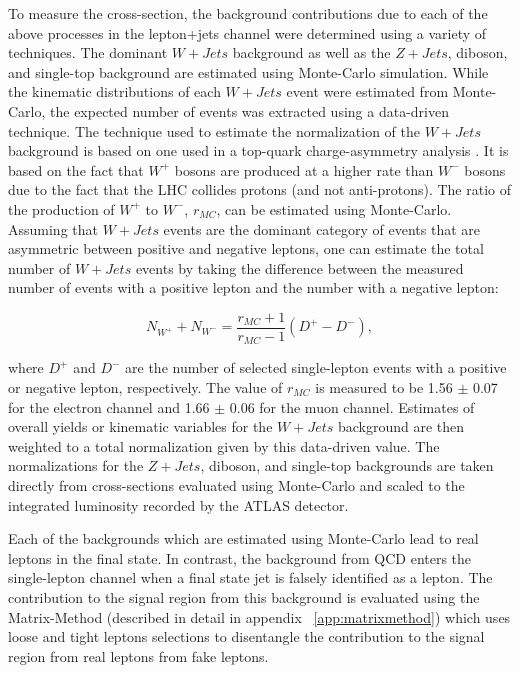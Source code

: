 To measure the cross-section, the background contributions due to each of the above processes in the lepton+jets channel were determined using a variety of techniques.
The dominant $W+Jets$ background as well as the $Z+Jets$, diboson, and single-top background are estimated using Monte-Carlo simulation.
While the kinematic distributions of each $W+Jets$ event were estimated from Monte-Carlo, the expected number of events was extracted using a data-driven technique.
The technique used to estimate the normalization of the $W+Jets$ background is based on one used in a top-quark charge-asymmetry analysis \cite{CHARGE_ASYMMETRY}.
It is based on the fact that $W^{+}$ bosons are produced at a higher rate than $W^{-}$ bosons due to the fact that the LHC collides protons (and not anti-protons).
The ratio of the production of $W^{+}$ to $W^{-}$, $r_{MC}$, can be estimated using Monte-Carlo.  Assuming that $W+Jets$ events are the dominant category of events that are asymmetric between positive and negative leptons, one can estimate the total number of $W+Jets$ events by taking the difference between the measured number of events with a positive lepton and the number with a negative lepton:

\begin{equation}
  N_{W^{+}} + N_{W^{-}} = \frac{r_{MC} + 1}{r_{MC} - 1}(D^{+} - D^{-}),
\end{equation}

where $D^{+}$ and $D^{-}$ are the number of selected single-lepton events with a positive or negative lepton, respectively.
The value of $r_{MC}$ is measured to be 1.56 $\pm$ 0.07 for the electron channel and 1.66 $\pm$ 0.06 for the muon channel.
Estimates of overall yields or kinematic variables for the $W+Jets$ background are then weighted to a total normalization given by this data-driven value.
The normalizations for the $Z+Jets$, diboson, and single-top backgrounds are taken directly from cross-sections evaluated using Monte-Carlo and scaled to the integrated luminosity recorded by the ATLAS detector.

Each of the backgrounds which are estimated using Monte-Carlo lead to real leptons in the final state.
In contrast, the background from QCD enters the single-lepton channel when a final state jet is falsely identified as a lepton.
The contribution to the signal region from this background is evaluated
using the Matrix-Method (described in detail in appendix ~\ref{app:matrixmethod}) which uses loose and tight
leptons selections to disentangle the contribution to the signal region from real leptons from fake leptons.

